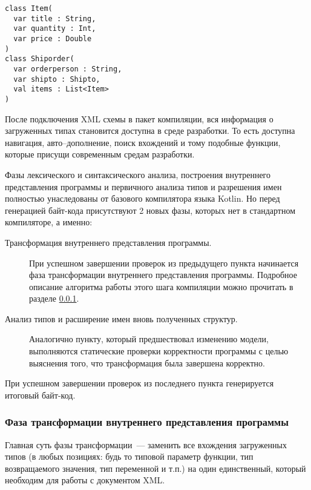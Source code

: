 \begin{code}\begin{lstlisting}[caption={Примеры описаний классов для загруженных типов.}, label=xsd-type-descriptors]
class Item(
  var title : String,
  var quantity : Int,
  var price : Double
)
class Shiporder(
  var orderperson : String,
  var shipto : Shipto,
  val items : List<Item>
)
\end{lstlisting}\end{code}

После подключения XML схемы в пакет компиляции, вся информация о загруженных типах становится доступна в среде разработки. То есть доступна навигация, авто--дополнение, поиск вхождений и тому подобные функции, которые присущи современным средам разработки.

Фазы лексического и синтаксического анализа, построения внутреннего представления программы и первичного анализа типов и разрешения имен полностью унаследованы от базового компилятора языка Kotlin. Но перед генерацией байт-кода присутствуют 2 новых фазы, которых нет в стандартном компиляторе, а именно:

\begin{description}
\item[Трансформация внутреннего представления программы.] При успешном завершении проверок из предыдущего пункта начинается фаза трансформации внутреннего представления программы. Подробное описание алгоритма работы этого шага компиляции можно прочитать в разделе \ref{xml-tranformation-phase}.
\item[Анализ типов и расширение имен вновь полученных структур.]
Аналогично пункту, который предшествовал изменению модели, выполняются статические проверки корректности программы с целью выяснения того, что трансформация была завершена корректно. 
\end{description}

При успешном завершении проверок из последнего пункта генерируется итоговый байт-код.

\subsubsection{Фаза трансформации внутреннего представления программы}\label{xml-tranformation-phase}
Главная суть фазы трансформации~--- заменить все вхождения загруженных типов (в любых позициях: будь то типовой параметр функции, тип возвращаемого значения, тип переменной и т.п.) на один единственный, который необходим для работы с документом XML.

